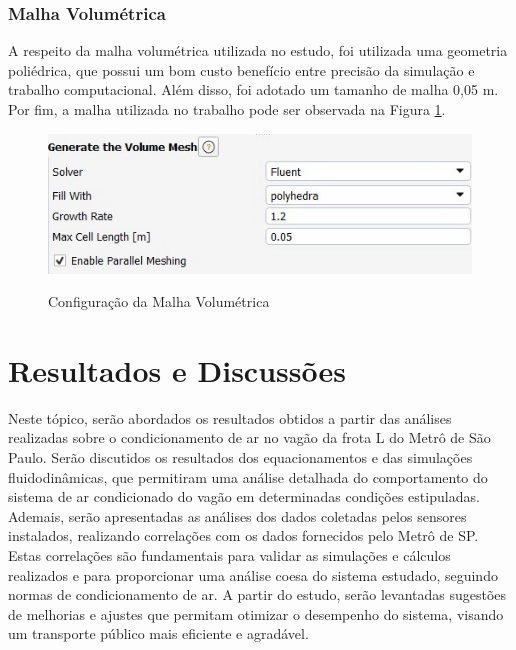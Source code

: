 \documentclass[acronym,symbols,table]{fei}
\begin{document}
\subsection{Malha Volumétrica}

A respeito da malha volumétrica utilizada no estudo, foi utilizada uma geometria poliédrica, que possui um bom custo benefício entre precisão da simulação e trabalho computacional. Além disso, foi adotado um tamanho de malha 0,05 m. Por fim, a malha utilizada no trabalho pode ser observada na Figura \ref{fig:Config_Malha}.

\begin{figure}[!htb]
    \centering
    \caption{Configuração da Malha Volumétrica}
    \includegraphics[width=1\linewidth]{Imagens/Config_Malha.jpg}
    \label{fig:Config_Malha}
\end{figure}



\chapter{Resultados e Discussões}

Neste tópico, serão abordados os resultados obtidos a partir das análises realizadas sobre o condicionamento de ar no vagão da frota L do Metrô de São Paulo. Serão discutidos os resultados dos equacionamentos e das simulações fluidodinâmicas, que permitiram uma análise detalhada do comportamento do sistema de ar condicionado do vagão em determinadas condições estipuladas. Ademais, serão apresentadas as análises dos dados coletadas pelos sensores instalados, realizando correlações com os dados fornecidos pelo Metrô de SP. Estas correlações são fundamentais para validar as simulações e cálculos realizados e para proporcionar uma análise coesa do sistema estudado, seguindo normas de condicionamento de ar. A partir do estudo, serão levantadas sugestões de melhorias e ajustes que permitam otimizar o desempenho do sistema, visando um transporte público mais eficiente e agradável.
\end{document}

